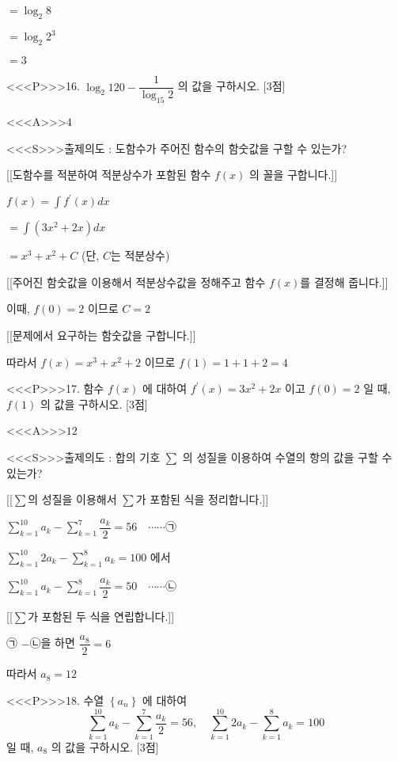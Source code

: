 \documentclass{oblivoir}
\begin{document}
$=\log _{2} 8$

$=\log _{2} 2^{3}$

$=3$


<<<P>>>16. $\log _{2} 120-\dfrac{1}{\log _{15} 2}$ 의 값을 구하시오. [3점]


<<<A>>>$4$

<<<S>>>출제의도 : 도함수가 주어진 함수의 함숫값을 구할 수 있는가?

[[도함수를 적분하여 적분상수가 포함된 함수 $f(x)$ 의 꼴을 구합니다.]]

$f(x) =\displaystyle\int f^{\prime}(x) d x$

$=\displaystyle\int\left(3 x^{2}+2 x\right) d x$

$=x^{3}+x^{2}+C$ (단, $C$는 적분상수)

[[주어진 함숫값을 이용해서 적분상수값을 정해주고 함수 $f(x)$를 결정해 줍니다.]]

이때, $f(0)=2$ 이므로 $C=2$

[[문제에서 요구하는 함숫값을 구합니다.]]

따라서 $f(x)=x^{3}+x^{2}+2$ 이므로 $f(1)=1+1+2=4$

<<<P>>>17. 함수 $f(x)$ 에 대하여 $f^{\prime}(x)=3 x^{2}+2 x$ 이고 $f(0)=2$ 일 때, $f(1)$ 의 값을 구하시오. [3점]


<<<A>>>$12$

<<<S>>>출제의도 : 합의 기호 $\displaystyle\sum$ 의 성질을 이용하여 수열의 항의 값을 구할 수 있는가?

[[$\displaystyle\sum$의 성질을 이용해서 $\displaystyle\sum$가 포함된 식을 정리합니다.]]

$\displaystyle\sum_{k=1}^{10} a_{k}-\displaystyle\sum_{k=1}^{7} \dfrac{a_{k}}{2}=56 \quad \cdots \cdots $㉠

$\displaystyle\sum_{k=1}^{10} 2 a_{k}-\displaystyle\sum_{k=1}^{8} a_{k}=100$ 에서

$\displaystyle\sum_{k=1}^{10} a_{k}-\displaystyle\sum_{k=1}^{8} \dfrac{a_{k}}{2}=50 \quad \cdots \cdots $㉡

[[$\displaystyle\sum$가 포함된 두 식을 연립합니다.]]

㉠ $-$㉡을 하면  $\dfrac{a_{8}}{2}=6$

따라서 $a_{8}=12$

<<<P>>>18. 수열 $\left\{a_{n}\right\}$ 에 대하여
$$
\displaystyle\sum_{k=1}^{10} a_{k}-\displaystyle\sum_{k=1}^{7} \dfrac{a_{k}}{2}=56, \quad \displaystyle\sum_{k=1}^{10} 2 a_{k}-\displaystyle\sum_{k=1}^{8} a_{k}=100
$$
일 때, $a_{8}$ 의 값을 구하시오. [3점]
\end{document}
